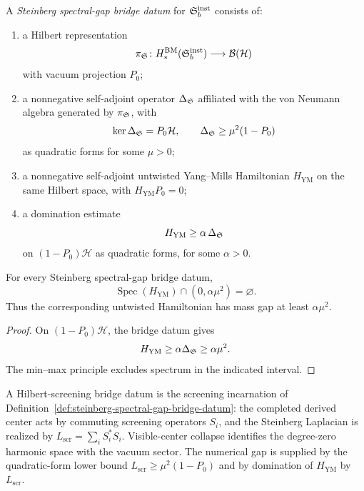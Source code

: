 \begin{definition}
\label{def:steinberg-spectral-gap-bridge-datum}
A \emph{Steinberg spectral-gap bridge datum} for $\mathfrak{S}_b^{\mathrm{inst}}$ consists of:
\begin{enumerate}[label=(\roman*)]
\item a Hilbert representation
\[
\pi_{\mathfrak{S}}\colon H_*^{\mathrm{BM}}(\mathfrak{S}_b^{\mathrm{inst}})
\longrightarrow \mathcal B(\mathcal H)
\]
with vacuum projection $P_0$;
\item a nonnegative self-adjoint operator $\Delta_{\mathfrak{S}}$ affiliated with the von Neumann algebra
generated by $\pi_{\mathfrak{S}}$, with
\[
\ker \Delta_{\mathfrak{S}}=P_0\mathcal H,\qquad
\Delta_{\mathfrak{S}}\ge \mu^2(1-P_0)
\]
as quadratic forms for some $\mu>0$;
\item a nonnegative self-adjoint untwisted Yang--Mills Hamiltonian $H_{\mathrm{YM}}$ on the same
Hilbert space, with $H_{\mathrm{YM}}P_0=0$;
\item a domination estimate
\[
H_{\mathrm{YM}}\ge \alpha\,\Delta_{\mathfrak{S}}
\]
on $(1-P_0)\mathcal H$ as quadratic forms, for some $\alpha>0$.
\end{enumerate}
\end{definition}

\begin{theorem}
\label{thm:steinberg-domination-mass-gap}
For every Steinberg spectral-gap bridge datum,
\[
\operatorname{Spec}(H_{\mathrm{YM}})\cap(0,\alpha\mu^2)=\varnothing.
\]
Thus the corresponding untwisted Hamiltonian has mass gap at least $\alpha\mu^2$.
\end{theorem}

\begin{proof}
On $(1-P_0)\mathcal H$, the bridge datum gives
\[
H_{\mathrm{YM}}\ge \alpha\Delta_{\mathfrak{S}}\ge \alpha\mu^2.
\]
The min--max principle excludes spectrum in the indicated interval.
\end{proof}

\begin{remark}
\label{rem:hilbert-screening-bridge}
A Hilbert-screening bridge datum is the screening incarnation of
Definition~\ref{def:steinberg-spectral-gap-bridge-datum}: the completed derived center acts by
commuting screening operators $S_i$, and the Steinberg Laplacian is realized by
$L_{\mathrm{scr}}=\sum_i S_i^*S_i$.
Visible-center collapse identifies the degree-zero harmonic space with the vacuum sector.
The numerical gap is supplied by the quadratic-form lower bound
$L_{\mathrm{scr}}\ge \mu^2(1-P_0)$ and by domination of $H_{\mathrm{YM}}$ by $L_{\mathrm{scr}}$.
\end{remark}

